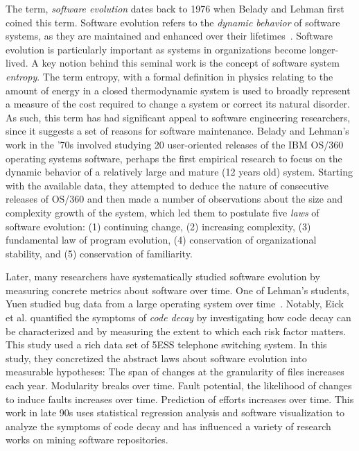\documentclass[runningheads,a4paper]{llncs}
\begin{document}
The term, {\em software evolution} dates back to 1976 when Belady and Lehman first coined this term. Software evolution refers to the {\em dynamic behavior} of software systems, as they are maintained and enhanced over their lifetimes~\cite{Belady1976:ModelEvolution}. Software evolution is particularly important as systems in organizations become longer-lived. %
A key notion behind this seminal work is the concept of software system {\em entropy}. The term entropy, with a formal definition in physics relating to the amount of energy in a closed thermodynamic system is used to broadly represent a measure of the cost required to change a system or correct its natural disorder. As such, this term has had significant appeal to software engineering researchers, since it suggests a set of reasons for software maintenance. Belady and Lehman's work in the '70s involved studying 20 user-oriented releases of the IBM OS/360 operating systems software, perhaps the first empirical research to focus on the dynamic behavior of a relatively large and mature (12 years old) system. Starting with the available data, they attempted to deduce the nature of consecutive releases of OS/360 and then made a number of observations about the size and complexity growth of the system, which led them to postulate five {\em laws} of software evolution: (1) continuing change, (2) increasing complexity, (3) fundamental law of program evolution, (4) conservation of organizational stability, and (5) conservation of familiarity. 

Later, many researchers have systematically studied software evolution by measuring concrete metrics about software over time. One of Lehman's students, Yuen studied bug data from a large operating system over time~\cite{ChongHokYuen1986:EAS}. Notably, Eick et al.\cite{Eick2001:CodeDecay} quantified the symptoms of {\em code decay} by investigating how code decay can be characterized and by measuring the extent to which each risk factor matters. This study used a rich data set of 5ESS telephone switching system. In this study, they concretized the abstract laws about software evolution into measurable hypotheses: The span of changes at the granularity of files increases each year.  Modularity breaks over time.  Fault potential, the likelihood of changes to induce faults increases over time.  Prediction of efforts increases over time. This work in late 90s uses statistical regression analysis and software visualization to analyze the symptoms of code decay and has influenced a variety of research works on mining software repositories. 
\end{document}
